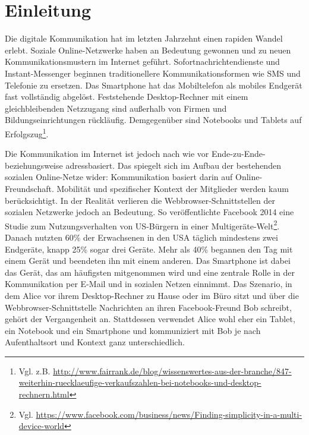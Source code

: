\chapter{Einleitung}\label{ch:einleitung}
Die digitale Kommunikation hat im letzten Jahrzehnt einen rapiden Wandel erlebt. Soziale Online-Netzwerke haben an Bedeutung gewonnen und zu neuen Kommunikationsmustern im Internet geführt. Sofortnachrichtendienste und Instant-Messenger beginnen traditionellere Kommunikationsformen wie SMS und Telefonie zu ersetzen. Das Smartphone hat das Mobiltelefon als mobiles Endgerät fast vollständig abgelöst. Feststehende Desktop-Rechner mit einem gleichbleibenden Netzzugang sind außerhalb von Firmen und Bildungseinrichtungen rückläufig. Demgegenüber sind Notebooks und Tablets auf Erfolgszug\footnote{Vgl. z.B. \url{http://www.fairrank.de/blog/wissenswertes-aus-der-branche/847-weiterhin-ruecklaeufige-verkaufszahlen-bei-notebooks-und-desktop-rechnern.html}}. 

Die Kommunikation im Internet ist jedoch nach wie vor Ende-zu-Ende- beziehungsweise adressbasiert. Das spiegelt sich im Aufbau der bestehenden sozialen Online-Netze wider: Kommunikation basiert darin auf Online-Freundschaft. Mobilität und spezifischer Kontext der Mitglieder werden kaum berücksichtigt. In der Realität verlieren die Webbrowser-Schnittstellen der sozialen Netzwerke jedoch an Bedeutung. So veröffentlichte Facebook 2014 eine Studie zum Nutzungsverhalten von US-Bürgern in einer Multigeräte-Welt\footnote{Vgl. \url{https://www.facebook.com/business/news/Finding-simplicity-in-a-multi-device-world}}. Danach nutzten 60\% der Erwachsenen in den USA täglich mindestens zwei Endgeräte, knapp 25\% sogar drei Geräte. Mehr als 40\% begannen den Tag mit einem Gerät und beendeten ihn mit einem anderen. Das Smartphone ist dabei das Gerät, das am häufigsten mitgenommen wird und eine zentrale Rolle in der Kommunikation per E-Mail und in sozialen Netzen einnimmt. Das Szenario, in dem Alice vor ihrem Desktop-Rechner zu Hause oder im Büro sitzt und über die Webbrowser-Schnittstelle Nachrichten an ihren Facebook-Freund Bob schreibt, gehört der Vergangenheit an. Stattdessen verwendet Alice wohl eher ein Tablet, ein Notebook und ein Smartphone und kommuniziert mit Bob je nach Aufenthaltsort und Kontext ganz unterschiedlich. 

